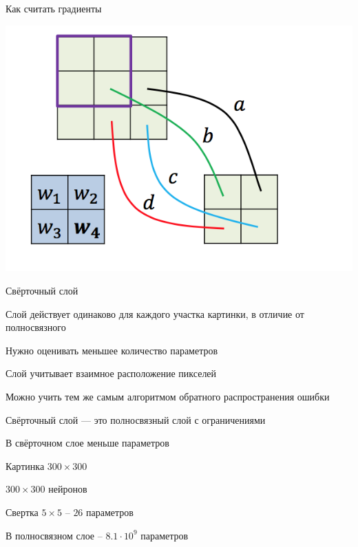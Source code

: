 \documentclass[notes,12pt, aspectratio=169]{beamer}
\newenvironment{wideitemize}{\itemize\addtolength{\itemsep}{10pt}}{\enditemize}
\begin{document}
\begin{frame}{Как считать градиенты}
\begin{center}
 \includegraphics[width=.4\linewidth]{back_cl1.png}
\end{center}



\end{frame}


\begin{frame}{Свёрточный слой}
\begin{wideitemize}
	\item  Слой действует одинаково для каждого участка картинки, в отличие от полносвязного 
	\item  Нужно оценивать меньшее количество параметров
	\item  Слой учитывает взаимное расположение пикселей
	\item  Можно учить тем же самым алгоритмом обратного распространения ошибки
	\item  Свёрточный слой —  это полносвязный слой с ограничениями
\end{wideitemize}
\end{frame}


\begin{frame}{В свёрточном слое меньше параметров}
\begin{wideitemize}
	\item  Картинка $300 \times 300$
	\item  $300 \times 300$  нейронов
	\item  Свертка $5 \times 5$ – $26$ параметров
	\item В полносвязном слое – $8.1 \cdot 10^9$ параметров
\end{wideitemize}
\end{frame}
\end{document}
